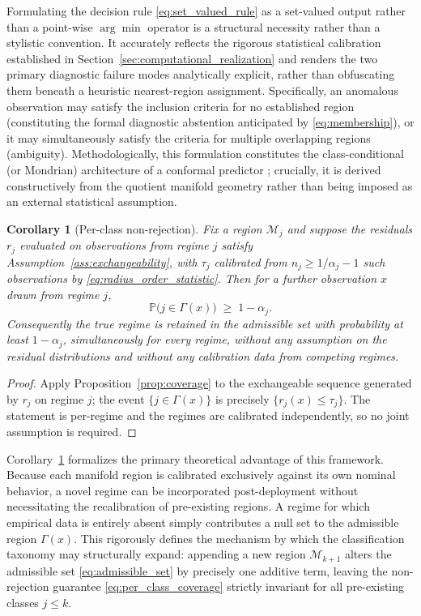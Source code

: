 \documentclass[a4paper]{cas-sc}
\newtheorem{corollary}{Corollary}
\newcommand{\residual}{\ensuremath{r}}
\newcommand{\Prob}{\ensuremath{\mathbb{P}}}
\begin{document}
Formulating the decision rule \eqref{eq:set_valued_rule} as a set-valued output rather than a point-wise \(\arg\min\) operator is a structural necessity rather than a stylistic convention. It accurately reflects the rigorous statistical calibration established in Section~\ref{sec:computational_realization} and renders the two primary diagnostic failure modes analytically explicit, rather than obfuscating them beneath a heuristic nearest-region assignment. Specifically, an anomalous observation may satisfy the inclusion criteria for no established region (constituting the formal diagnostic abstention anticipated by \eqref{eq:membership}), or it may simultaneously satisfy the criteria for multiple overlapping regions (ambiguity). Methodologically, this formulation constitutes the class-conditional (or Mondrian) architecture of a conformal predictor \citep{vovk2005,shafer2008}; crucially, it is derived constructively from the quotient manifold geometry rather than being imposed as an external statistical assumption.

\begin{corollary}[Per-class non-rejection]
\label{cor:per_class_coverage}
Fix a region \(\mathcal{M}_j\) and suppose the residuals
\(\residual_j\) evaluated on observations from regime \(j\) satisfy
Assumption~\ref{ass:exchangeability}, with \(\tau_j\) calibrated from
\(n_j\ge 1/\alpha_j-1\) such observations by
\eqref{eq:radius_order_statistic}. Then for a further observation \(x\) drawn
from regime \(j\),
\begin{equation}
\Prob\bigl(j\in\Gamma(x)\bigr)\;\ge\;1-\alpha_j .
\label{eq:per_class_coverage}
\end{equation}
Consequently the true regime is retained in the admissible set with
probability at least \(1-\alpha_j\), simultaneously for every regime, without
any assumption on the residual distributions and without any calibration data
from competing regimes.
\end{corollary}

\begin{proof}
Apply Proposition~\ref{prop:coverage} to the exchangeable sequence generated
by \(\residual_j\) on regime \(j\); the event \(\{j\in\Gamma(x)\}\) is
precisely \(\{\residual_j(x)\le\tau_j\}\). The statement is per-regime and the
regimes are calibrated independently, so no joint assumption is required.
\end{proof}

Corollary~\ref{cor:per_class_coverage} formalizes the primary theoretical advantage of this framework. Because each manifold region is calibrated exclusively against its own nominal behavior, a novel regime can be incorporated post-deployment without necessitating the recalibration of pre-existing regions. A regime for which empirical data is entirely absent simply contributes a null set to the admissible region \(\Gamma(x)\). This rigorously defines the mechanism by which the classification taxonomy may structurally expand: appending a new region \(\mathcal{M}_{k+1}\) alters the admissible set \eqref{eq:admissible_set} by precisely one additive term, leaving the non-rejection guarantee \eqref{eq:per_class_coverage} strictly invariant for all pre-existing classes \(j\le k\).
\end{document}
